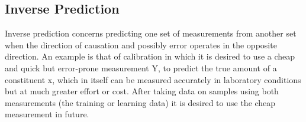 
\subsection{Inverse Prediction}
Inverse prediction concerns predicting one set of measurements from another set when the direction of causation and possibly error operates in the opposite direction. An example is that of calibration in which it is desired to use a cheap and quick but error-prone measurement Y, to predict the true amount of a constituent x, which in itself can be measured accurately in laboratory conditions but at much greater effort or cost. After taking data on samples using both measurements (the training or learning data) it is desired to use the cheap measurement in future.

